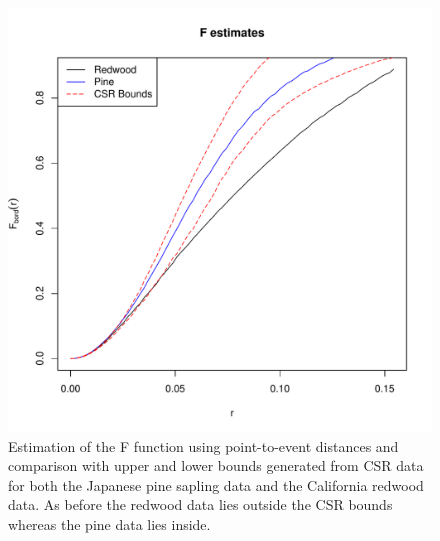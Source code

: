\documentclass{article}\usepackage[]{graphicx}\usepackage[]{color}
\makeatletter
\def\maxwidth{ %
  \ifdim\Gin@nat@width>\linewidth
    \linewidth
  \else
    \Gin@nat@width
  \fi
}
\newenvironment{knitrout}{}{} %
\makeatother
\begin{document}
\begin{figure}
\begin{knitrout}
\includegraphics[width=\maxwidth]{figure/secondorder2} 

\end{knitrout}
\caption{Estimation of the F function using point-to-event distances and comparison with upper and lower bounds generated from CSR data for both the Japanese pine sapling data and the California redwood data.  As before the redwood data lies outside the CSR bounds whereas the pine data lies inside.}
\label{fest2}
\end{figure}
\end{document}
